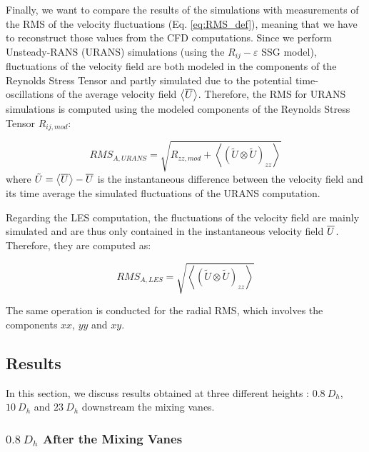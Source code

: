 \npar

Finally, we want to compare the results of the simulations with measurements of the RMS of the velocity fluctuations (Eq. \ref{eq:RMS_def}), meaning that we have to reconstruct those values from the CFD computations. Since we perform Unsteady-RANS (URANS) simulations (using the $R_{ij}-\varepsilon$ SSG model), fluctuations of the velocity field are both modeled in the components of the Reynolds Stress Tensor and partly simulated due to the potential time-oscillations of the average velocity field $\left<\overline{U}\right>$. Therefore, the RMS for URANS simulations is computed using the modeled components of the Reynolds Stress Tensor $R_{ij,mod}$:

\begin{equation}
RMS_{A,URANS} = \sqrt{R_{zz,mod} + \left< \left(\tilde{U} \otimes \tilde{U}\right)_{zz}\right>}
\label{eq:RMS_URANS}
\end{equation}
where $\tilde{U} = \left<\overline{U}\right> - \overline{U}$ is the instantaneous difference between the velocity field and its time average \ie the simulated fluctuations of the URANS computation.

\npar

Regarding the LES computation, the fluctuations of the velocity field are mainly simulated and are thus only contained in the instantaneous velocity field $\overline{U}$. Therefore, they are computed as:

\begin{equation}
RMS_{A,LES} = \sqrt{\left< \left(\tilde{U} \otimes \tilde{U}\right)_{zz} \right>}
\label{eq:RMS_LES}
\end{equation}

\npar

The same operation is conducted for the radial RMS, which involves the components ${xx}$, ${yy}$ and ${xy}$.



\subsection{Results}

In this section, we discuss results obtained at three different heights : $0.8\ D_{h}$, $10\ D_{h}$ and $23\ D_{h}$ downstream the mixing vanes.


\subsubsection{$0.8\ D_{h}$ After the Mixing Vanes}

